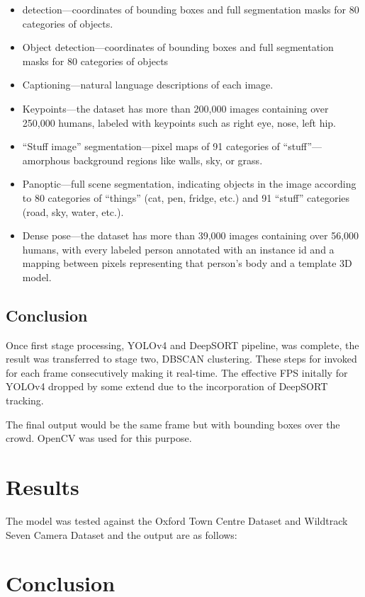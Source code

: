 \documentclass{fisatprojectfinal}
\begin{document}
\begin{itemize}
    \item detection—coordinates of bounding boxes and full segmentation masks for 80 categories of objects.
    \item Object detection—coordinates of bounding boxes and full segmentation masks for 80 categories of objects
    \item Captioning—natural language descriptions of each image.
    \item Keypoints—the dataset has more than 200,000 images containing over 250,000 humans, labeled with keypoints such as right eye, nose, left hip.
    \item “Stuff image” segmentation—pixel maps of 91 categories of “stuff”—amorphous background regions like walls, sky, or grass.
    \item Panoptic—full scene segmentation, indicating objects in the image according to 80 categories of “things” (cat, pen, fridge, etc.) and 91 “stuff” categories (road, sky, water, etc.).
    \item Dense pose—the dataset has more than 39,000 images containing over 56,000 humans, with every labeled person annotated with an instance id and a mapping between pixels representing that person’s body and a template 3D model.
\end{itemize}

\section{Conclusion}
Once first stage processing, YOLOv4 and DeepSORT pipeline, was complete, the result was transferred to stage two, DBSCAN clustering. These steps for invoked for each frame consecutively making it real-time. The effective FPS initally for YOLOv4 dropped by some extend due to the incorporation of DeepSORT tracking. 

The final output would be the same frame but with bounding boxes over the crowd. OpenCV was used for this purpose.

\chapter{Results}

The model was tested against the Oxford Town Centre Dataset and Wildtrack Seven Camera Dataset and the output are as follows:

\newpage
\thispagestyle{plain} %
\mbox{}

\chapter{Conclusion}
\end{document}
